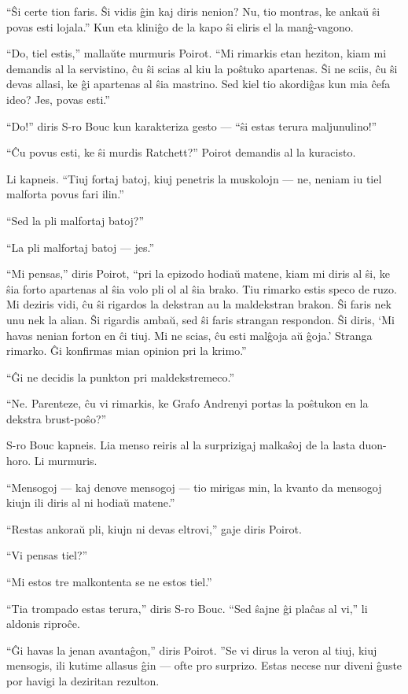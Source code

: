 ``Ŝi certe tion faris. Ŝi vidis ĝin kaj diris nenion? Nu, tio montras, ke ankaŭ ŝi povas esti lojala.'' Kun eta kliniĝo de la kapo ŝi eliris el la manĝ-vagono.

``Do, tiel estis,'' mallaŭte murmuris Poirot. ``Mi rimarkis etan heziton, kiam mi demandis al la servistino, ĉu ŝi scias al kiu la poŝtuko apartenas. Ŝi ne sciis, ĉu ŝi devas allasi, ke ĝi apartenas al ŝia mastrino. Sed kiel tio akordiĝas kun mia ĉefa ideo? Jes, povas esti.''

``Do!'' diris S-ro Bouc kun karakteriza gesto --- ``ŝi estas terura maljunulino!''

``Ĉu povus esti, ke ŝi murdis Ratchett?'' Poirot demandis al la kuracisto.

Li kapneis. ``Tiuj fortaj batoj, kiuj penetris la muskolojn --- ne, neniam iu tiel malforta povus fari ilin.''

``Sed la pli malfortaj batoj?''

``La pli malfortaj batoj --- jes.''

``Mi pensas,'' diris Poirot, ``pri la epizodo hodiaŭ matene, kiam mi diris al ŝi, ke ŝia forto apartenas al ŝia volo pli ol al ŝia brako. Tiu rimarko estis speco de ruzo. Mi deziris vidi, ĉu ŝi rigardos la dekstran au la maldekstran brakon. Ŝi faris nek unu nek la alian. Ŝi rigardis ambaŭ, sed ŝi faris strangan respondon. Ŝi diris, `Mi havas nenian forton en ĉi tiuj. Mi ne scias, ĉu esti malĝoja aŭ ĝoja.' Stranga rimarko. Ĝi konfirmas mian opinion pri la krimo.''

``Ĝi ne decidis la punkton pri maldekstremeco.''

``Ne. Parenteze, ĉu vi rimarkis, ke Grafo Andrenyi portas la poŝtukon en la dekstra brust-poŝo?''

S-ro Bouc kapneis. Lia menso reiris al la surprizigaj malkaŝoj de la lasta duon-horo. Li murmuris.

``Mensogoj --- kaj denove mensogoj --- tio mirigas min, la kvanto da mensogoj kiujn ili diris al ni hodiaŭ matene.''

``Restas ankoraŭ pli, kiujn ni devas eltrovi,'' gaje diris Poirot.

``Vi pensas tiel?''

``Mi estos tre malkontenta se ne estos tiel.''

``Tia trompado estas terura,'' diris S-ro Bouc. ``Sed ŝajne ĝi plaĉas al vi,'' li aldonis riproĉe.

``Ĝi havas la jenan avantaĝon,'' diris Poirot. ''Se vi dirus la veron al tiuj, kiuj mensogis, ili kutime allasus ĝin --- ofte pro surprizo. Estas necese nur diveni ĝuste por havigi la deziritan rezulton.

